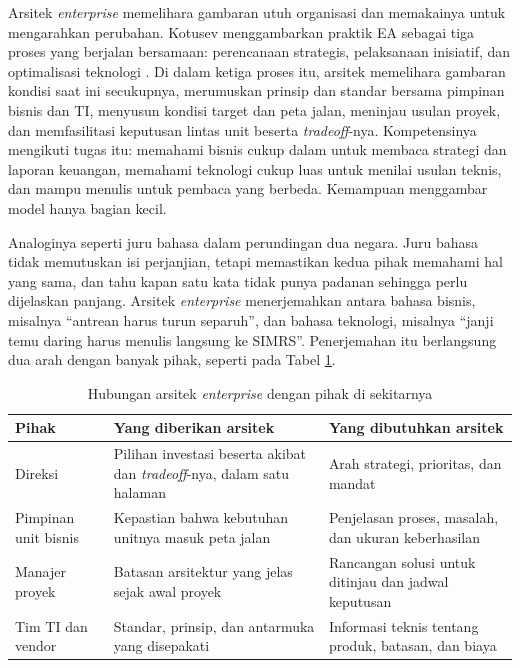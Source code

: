 Arsitek \textit{enterprise} memelihara gambaran utuh organisasi dan memakainya
untuk mengarahkan perubahan. Kotusev menggambarkan praktik EA sebagai tiga
proses yang berjalan bersamaan: perencanaan strategis, pelaksanaan inisiatif,
dan optimalisasi teknologi \cite{kotusev2021}. Di dalam ketiga proses itu,
arsitek memelihara gambaran kondisi saat ini secukupnya, merumuskan prinsip
dan standar bersama pimpinan bisnis dan TI, menyusun kondisi target dan peta
jalan, meninjau usulan proyek, dan memfasilitasi keputusan lintas unit
beserta \textit{tradeoff}-nya. Kompetensinya mengikuti tugas itu: memahami
bisnis cukup dalam untuk membaca strategi dan laporan keuangan, memahami
teknologi cukup luas untuk menilai usulan teknis, dan mampu menulis untuk
pembaca yang berbeda. Kemampuan menggambar model hanya bagian kecil.

Analoginya seperti juru bahasa dalam perundingan dua negara. Juru bahasa tidak
memutuskan isi perjanjian, tetapi memastikan kedua pihak memahami hal yang
sama, dan tahu kapan satu kata tidak punya padanan sehingga perlu dijelaskan
panjang. Arsitek \textit{enterprise} menerjemahkan antara bahasa bisnis,
misalnya ``antrean harus turun separuh'', dan bahasa teknologi, misalnya
``janji temu daring harus menulis langsung ke SIMRS''. Penerjemahan itu
berlangsung dua arah dengan banyak pihak, seperti pada Tabel
\ref{tab:ch01-hubungan}.

\begin{table}[!htb]
  \centering
  \caption{Hubungan arsitek \textit{enterprise} dengan pihak di sekitarnya}
  \label{tab:ch01-hubungan}
  \footnotesize
  \begin{tabularx}{\textwidth}{>{\raggedright\arraybackslash}p{2.4cm}
      >{\raggedright\arraybackslash}X >{\raggedright\arraybackslash}X}
    \hline
    \textbf{Pihak} & \textbf{Yang diberikan arsitek} & \textbf{Yang dibutuhkan arsitek} \\
    \hline
    Direksi & Pilihan investasi beserta akibat dan \textit{tradeoff}-nya, dalam satu halaman & Arah strategi, prioritas, dan mandat \\
    \hline
    Pimpinan unit bisnis & Kepastian bahwa kebutuhan unitnya masuk peta jalan & Penjelasan proses, masalah, dan ukuran keberhasilan \\
    \hline
    Manajer proyek & Batasan arsitektur yang jelas sejak awal proyek & Rancangan solusi untuk ditinjau dan jadwal keputusan \\
    \hline
    Tim TI dan vendor & Standar, prinsip, dan antarmuka yang disepakati & Informasi teknis tentang produk, batasan, dan biaya \\
    \hline
  \end{tabularx}
\end{table}

